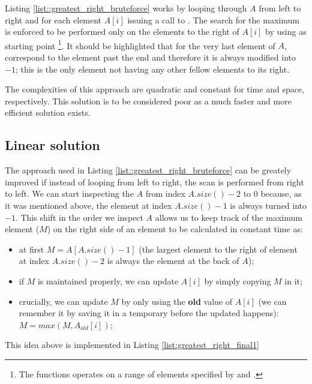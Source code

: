 

Listing \ref{list::greatest_right_bruteforce} works by looping through $A$ from left to right and for each element $A[i]$ issuing a call to . The search for the maximum is enforced to be performed only on the elements to the right of $A[i]$ by using as starting point \footnote{The  functions operates on a range of elements specified by  and  \cite{cit::std::maxelement}.}.
It should be highlighted that for the very last element of $A$,  correspond to the element past the end and therefore it is always modified into $-1$; this is the only element not having any other fellow elements to its right.

The complexities of this approach are quadratic and constant for time and space, respectively. 
This solution is to be considered poor as a much faster and more efficient solution exists.

\subsection{Linear solution}
\label{sec:greatest_right:linear}
The approach used in Listing \ref{list::greatest_right_bruteforce} can be greately improved if instead of looping from left to right, the scan is performed from right to left.
We can start inspecting the $A$ from index $A.size()-2$ to $0$ because, as it was mentioned above, the  element at index $A.size()-1$ is always turned into $-1$. 
This shift in the order we inspect $A$ allows us to keep track of the maximum element ($M$) on the right side of an element to be calculated in constant time as:
\begin{itemize}
	\item at first $M=A[A.size()-1]$ (the largest element to the right of element at index $A.size()-2$ is always the element at the back of $A$);
	\item if $M$ is maintained properly, we can update $A[i]$ by simply copying $M$ in it;
	\item crucially, we can update $M$ by only using the \textbf{old} value of $A[i]$ (we can remember it by saving it in a temporary before the updated happens): $M= max(M, A_{old}[i])$;
\end{itemize}
This idea above is implemented in Listing \ref{list:greatest_right_final1}

